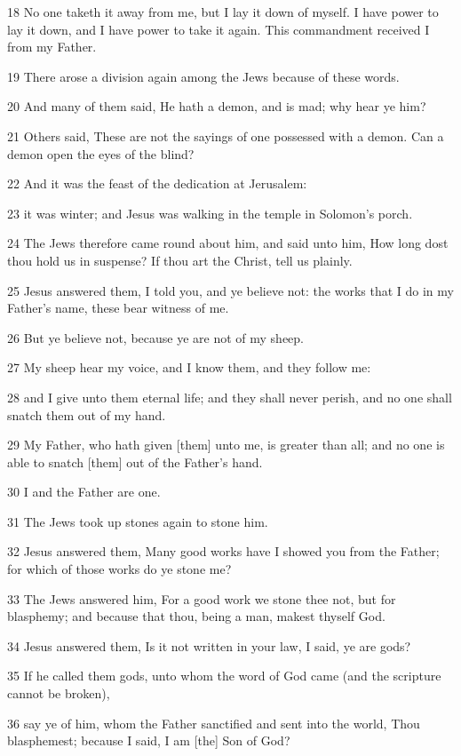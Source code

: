 \par 18 No one taketh it away from me, but I lay it down of myself. I have power to lay it down, and I have power to take it again. This commandment received I from my Father.
\par 19 There arose a division again among the Jews because of these words.
\par 20 And many of them said, He hath a demon, and is mad; why hear ye him?
\par 21 Others said, These are not the sayings of one possessed with a demon. Can a demon open the eyes of the blind?
\par 22 And it was the feast of the dedication at Jerusalem:
\par 23 it was winter; and Jesus was walking in the temple in Solomon's porch.
\par 24 The Jews therefore came round about him, and said unto him, How long dost thou hold us in suspense? If thou art the Christ, tell us plainly.
\par 25 Jesus answered them, I told you, and ye believe not: the works that I do in my Father's name, these bear witness of me.
\par 26 But ye believe not, because ye are not of my sheep.
\par 27 My sheep hear my voice, and I know them, and they follow me:
\par 28 and I give unto them eternal life; and they shall never perish, and no one shall snatch them out of my hand.
\par 29 My Father, who hath given [them] unto me, is greater than all; and no one is able to snatch [them] out of the Father's hand.
\par 30 I and the Father are one.
\par 31 The Jews took up stones again to stone him.
\par 32 Jesus answered them, Many good works have I showed you from the Father; for which of those works do ye stone me?
\par 33 The Jews answered him, For a good work we stone thee not, but for blasphemy; and because that thou, being a man, makest thyself God.
\par 34 Jesus answered them, Is it not written in your law, I said, ye are gods?
\par 35 If he called them gods, unto whom the word of God came (and the scripture cannot be broken),
\par 36 say ye of him, whom the Father sanctified and sent into the world, Thou blasphemest; because I said, I am [the] Son of God?
